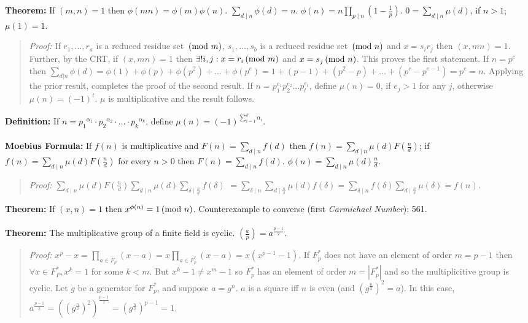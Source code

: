 {\bf Theorem:} 
If $(m,n)=1$ then $\phi(mn)= \phi(m) \phi(n)$.
$ \sum_{d \mid n} \phi(d)= n$.
$ \phi(n)=  n \prod_{p \mid n} (1- {\frac {1} {p}})$.
$ 0=  \sum_{d \mid n} \mu(d)$, if $n>1$; $\mu(1)=1$.
\begin{quote}
\emph{Proof:}
If $r_1, \ldots, r_a$ is a reduced residue set $\thinspace \textnormal{(mod } m \textnormal{)}$,
$s_1, \ldots , s_b$ is a reduced residue set $\thinspace \textnormal{(mod } n \textnormal{)}$ and
$x= s_i r_j$ then $(x,mn)=1$.  Further, by the CRT, if
$(x, mn)=1$ then $\exists ! i, j: x= r_i \thinspace \textnormal{(mod } m \textnormal{)}$ and $x= s_j \thinspace \textnormal{(mod } n \textnormal{)}$.  This proves
the first statement.  If $n= p^e$ then
$\sum_{d|n} \phi(d)= \phi(1) + \phi(p) + \phi(p^2) + \ldots + \phi(p^e)=
1 + (p-1) + (p^2-p) + \ldots + (p^e - p^{e-1})= p^e = n$.  Applying the prior result,
completes the proof of the second result.  If $n= p_1^{e_1} p_2^{e_2} \ldots p_t^{e_t}$,
define $\mu(n)=0$, if $e_j > 1$ for any $j$, otherwise $\mu(n)= (-1)^t$.  $\mu$ is
multiplicative and the result follows.
\end{quote}
{\bf Definition:} If $n = {p_1}^{\alpha_1} \cdot {p_2}^{\alpha_2} \cdot \ldots \cdot {p_k}^{\alpha_k}$, define
$\mu(n) = (-1)^{\sum_{i=1}^k \alpha_i}$.
\\
\\
{\bf Moebius Formula:} If $f(n)$ is multiplicative and 
$F(n)=  \sum_{d \mid n} f(d)$ then
$f(n)= \sum_{d \mid n} \mu(d) F({\frac {n} {d}})$;  if
$f(n)= \sum_{d \mid n} \mu(d) F({\frac {n} {d}})$ for every $n>0$ then
$F(n)=  \sum_{d \mid n} f(d)$.
$\phi(n)=  \sum_{d \mid n} \mu(d) {\frac {n} {d}}$.
\begin{quote}
\emph{Proof:}
$\sum_{d \mid n} \mu(d) F({\frac {n} {d}})
\sum_{d \mid n} \mu(d) \sum_{\delta  \mid  {\frac n d}} f(\delta)$
$=\sum_{\delta  \mid n} \sum_{d  \mid  {\frac n \delta}} \mu(d) f(\delta)=
\sum_{\delta  \mid n} f(\delta) \sum_{d  \mid  {\frac n \delta}} \mu(\delta) = f(n)$.
\end{quote}
{\bf Theorem:} If $(x,n)=1$ then $x^{\phi(n)}= 1 \thinspace \textnormal{(mod } n \textnormal{)}$.  Counterexample to converse
(first \emph{Carmichael Number}): 561.
\\
\\
{\bf Theorem:}
The multiplicative group of a finite field is cyclic.
$({\frac {a} {p}}) = a^{\frac {p-1} {2}}$.
\begin{quote}
\emph{Proof:}
$x^p-x = \prod_{a \in F_p} (x-a) = x \prod_{a \in F_p^*} (x-a) = x (x^{p-1} -1) $.
If $F_p^*$ does not have an element of order $m=p-1$ then $\forall x \in F_P^*, x^k = 1$
for some $k < m$. But $x^k-1 \ne x^m -1$ so $F_p^*$ has an element of order
$m = |F_p^*|$ and so the multiplicitive group is cyclic.  Let $g$ be a generator for
$F_p^*$, and suppose $a = g^n$.  $a$ is a square iff $n$ is even (and $(g^{\frac n 2})^2 = a$).
In this case, 
$a^{\frac {p-1} {2}}= ((g^{\frac n 2})^2)^{\frac {p-1} 2} = (g^{\frac n 2})^{p-1} = 1$.
\end{quote}
